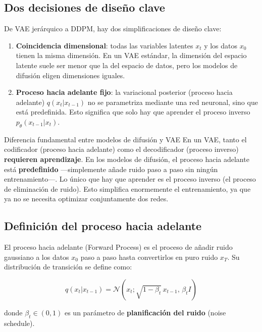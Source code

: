 \documentclass[a4paper]{article}
\begin{document}
\subsection{Dos decisiones de diseño clave}

De VAE jerárquico a DDPM, hay dos simplificaciones de diseño clave:

\begin{enumerate}
    \item \textbf{Coincidencia dimensional}: todas las variables latentes $x_t$ y los datos $x_0$ tienen la misma dimensión. En un VAE estándar, la dimensión del espacio latente suele ser menor que la del espacio de datos, pero los modelos de difusión eligen dimensiones iguales.
    \item \textbf{Proceso hacia adelante fijo}: la variacional posterior (proceso hacia adelante) $q(x_t|x_{t-1})$ no se parametriza mediante una red neuronal, sino que está predefinida. Esto significa que solo hay que aprender el proceso inverso $p_\theta(x_{t-1}|x_t)$.
\end{enumerate}

\begin{importantbox}{Diferencia fundamental entre modelos de difusión y VAE}
En un VAE, tanto el codificador (proceso hacia adelante) como el decodificador (proceso inverso) \textbf{requieren aprendizaje}. En los modelos de difusión, el proceso hacia adelante está \textbf{predefinido} —simplemente añade ruido paso a paso sin ningún entrenamiento—. Lo único que hay que aprender es el proceso inverso (el proceso de eliminación de ruido). Esto simplifica enormemente el entrenamiento, ya que ya no se necesita optimizar conjuntamente dos redes.
\end{importantbox}

\subsection{Definición del proceso hacia adelante}

El proceso hacia adelante (Forward Process) es el proceso de añadir ruido gaussiano a los datos $x_0$ paso a paso hasta convertirlos en puro ruido $x_T$. Su distribución de transición se define como:

$$q(x_t | x_{t-1}) = \mathcal{N}(x_t; \sqrt{1 - \beta_t} \, x_{t-1}, \, \beta_t I)$$

donde $\beta_t \in (0, 1)$ es un parámetro de \textbf{planificación del ruido} (noise schedule).
\end{document}

